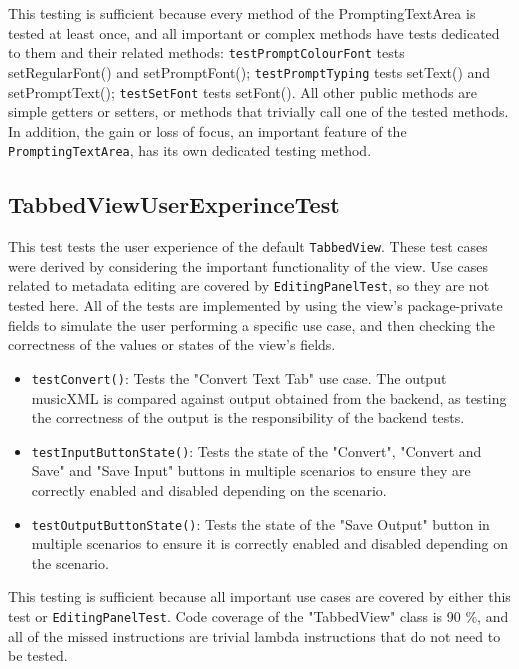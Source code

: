 \documentclass[11pt]{article}
\begin{document}
This testing is sufficient because every method of the PromptingTextArea is tested at least once, and all important or complex methods have tests dedicated to them and their related methods: \texttt{testPromptColourFont} tests setRegularFont() and setPromptFont(); \texttt{testPromptTyping} tests setText() and setPromptText(); \texttt{testSetFont} tests setFont().  All other public methods are simple getters or setters, or methods that trivially call one of the tested methods.  In addition, the gain or loss of focus, an important feature of the \texttt{PromptingTextArea}, has its own dedicated testing method.
\subsection{TabbedViewUserExperinceTest}
\label{sec:orga351aa3}
This test tests the user experience of the default \texttt{TabbedView}.  These test cases were derived by considering the important functionality of the view.  Use cases related to metadata editing are covered by \texttt{EditingPanelTest}, so they are not tested here.
All of the tests are implemented by using the view's package-private fields to simulate the user performing a specific use case, and then checking the correctness of the values or states of the view's fields.
\begin{itemize}
\item \texttt{testConvert()}: Tests the "Convert Text Tab" use case.  The output musicXML is compared against output obtained from the backend, as testing the correctness of the output is the responsibility of the backend tests.
\item \texttt{testInputButtonState()}: Tests the state of the "Convert", "Convert and Save" and "Save Input" buttons in multiple scenarios to ensure they are correctly enabled and disabled depending on the scenario.
\item \texttt{testOutputButtonState()}: Tests the state of the "Save Output" button in multiple scenarios to ensure it is correctly enabled and disabled depending on the scenario.
\end{itemize}

This testing is sufficient because all important use cases are covered by either this test or \texttt{EditingPanelTest}.  Code coverage of the "TabbedView" class is 90 \%, and all of the missed instructions are trivial lambda instructions that do not need to be tested.
\end{document}
